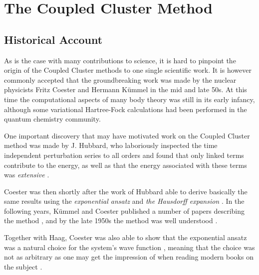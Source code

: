 
\chapter{The Coupled Cluster Method} %

\label{Chapter5} %



\section{Historical Account}


As is the case with many contributions to science, it is hard to
pinpoint the origin of the Coupled Cluster methods to one single
scientific work. It is however commonly accepted that the groundbreaking
work was made by the nuclear physicists Fritz Coester and
Hermann Kümmel in the mid and late 50s. At this time the computational aspects
of many body theory was still in its early infancy, although some
variational Hartree-Fock calculations had been performed in the
quantum chemistry community. \cite{Kummel}

One important discovery that may have motivated work on the Coupled
Cluster method was made by J. Hubbard, who laboriously inspected the
time independent perturbation series to all orders and found that only
linked terms contribute to the energy, as well as that the energy
associated with these terms was \emph{extensive} \cite{Hubbard}.

Coester was then shortly after the work of Hubbard able to derive
basically the same results using the \emph{exponential ansatz} and
\emph{the Hausdorff expansion} \cite{Kummel}. In the following years,
Kümmel and Coester published a number of papers describing the method \cite{Coester1958, Coester1960b},
and by the late 1950s the method was well understood \cite{Kummel}.

Together with Haag, Coester was also able to show that the
exponential ansatz was a natural choice for the system's wave function
\cite{Coester1960a}, meaning that the choice was not as arbitrary as one may get
the impression of when reading modern books on the
subject \cite{ShavittBartlett2009}.


